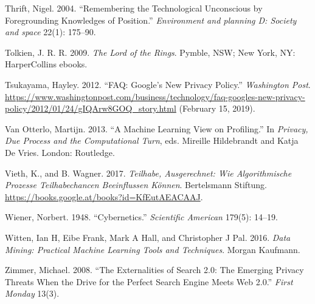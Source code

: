 \documentclass[12pt,twoside]{report}
\begin{document}
\leavevmode\hypertarget{ref-Thrift2004}{}%
Thrift, Nigel. 2004. ``Remembering the Technological Unconscious by Foregrounding Knowledges of Position.'' \emph{Environment and planning D: Society and space} 22(1): 175--90.

\leavevmode\hypertarget{ref-Tolkien2009}{}%
Tolkien, J. R. R. 2009. \emph{The Lord of the Rings}. Pymble, NSW; New York, NY: HarperCollins ebooks.

\leavevmode\hypertarget{ref-Tsukayama2012}{}%
Tsukayama, Hayley. 2012. ``FAQ: Google's New Privacy Policy.'' \emph{Washington Post}. \url{https://www.washingtonpost.com/business/technology/faq-googles-new-privacy-policy/2012/01/24/gIQArw8GOQ_story.html} (February 15, 2019).

\leavevmode\hypertarget{ref-Otterlo2013}{}%
Van Otterlo, Martijn. 2013. ``A Machine Learning View on Profiling.'' In \emph{Privacy, Due Process and the Computational Turn}, eds. Mireille Hildebrandt and Katja De Vries. London: Routledge.

\leavevmode\hypertarget{ref-Vieth2017}{}%
Vieth, K., and B. Wagner. 2017. \emph{Teilhabe, Ausgerechnet: Wie Algorithmische Prozesse Teilhabechancen Beeinflussen Können}. Bertelsmann Stiftung. \url{https://books.google.at/books?id=KfEutAEACAAJ}.

\leavevmode\hypertarget{ref-Wiener1948}{}%
Wiener, Norbert. 1948. ``Cybernetics.'' \emph{Scientific American} 179(5): 14--19.

\leavevmode\hypertarget{ref-Witten2016}{}%
Witten, Ian H, Eibe Frank, Mark A Hall, and Christopher J Pal. 2016. \emph{Data Mining: Practical Machine Learning Tools and Techniques}. Morgan Kaufmann.

\leavevmode\hypertarget{ref-Zimmer2008}{}%
Zimmer, Michael. 2008. ``The Externalities of Search 2.0: The Emerging Privacy Threats When the Drive for the Perfect Search Engine Meets Web 2.0.'' \emph{First Monday} 13(3).
\end{document}
